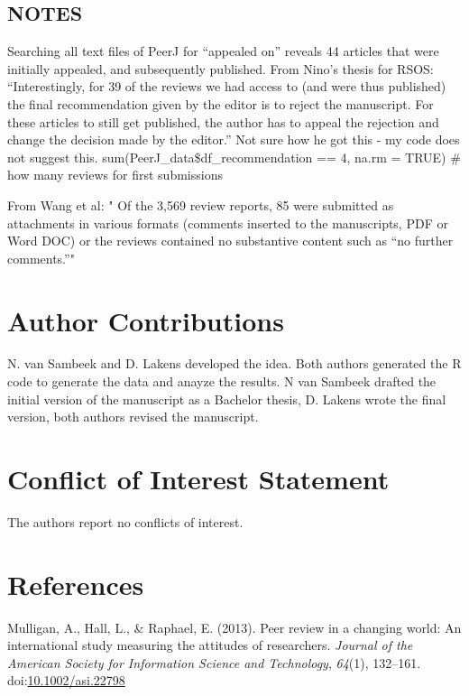 \documentclass[,jou, a4paper,floatsintext]{apa6}
\begin{document}
\hypertarget{notes}{%
\subsection{NOTES}\label{notes}}

Searching all text files of PeerJ for \enquote{appealed on} reveals 44 articles that were initially appealed, and subsequently published.
From Nino's thesis for RSOS: \enquote{Interestingly, for 39 of the reviews we had
access to (and were thus published) the final recommendation given by the editor is to reject the manuscript. For these articles to still get published, the author has to appeal the rejection and change the decision made by the editor.}
Not sure how he got this - my code does not suggest this.
sum(PeerJ\_data\$df\_recommendation == 4, na.rm = TRUE) \# how many reviews for first submissions

From Wang et al: " Of the 3,569 review reports, 85 were submitted as
attachments in various formats (comments inserted to the manuscripts, PDF or Word
DOC) or the reviews contained no substantive content such as \enquote{no further comments.}"

\hypertarget{author-contributions}{%
\section{Author Contributions}\label{author-contributions}}

N. van Sambeek and D. Lakens developed the idea. Both authors generated the R code to generate the data and anayze the results. N van Sambeek drafted the initial version of the manuscript as a Bachelor thesis, D. Lakens wrote the final version, both authors revised the manuscript.

\hypertarget{conflict-of-interest-statement}{%
\section{Conflict of Interest Statement}\label{conflict-of-interest-statement}}

The authors report no conflicts of interest.

\hypertarget{references}{%
\section{References}\label{references}}

\setlength{\parindent}{-0.5in}
\setlength{\leftskip}{0.5in}

\hypertarget{refs}{}
\leavevmode\hypertarget{ref-mulligan_peer_2013}{}%
Mulligan, A., Hall, L., \& Raphael, E. (2013). Peer review in a changing world: An international study measuring the attitudes of researchers. \emph{Journal of the American Society for Information Science and Technology}, \emph{64}(1), 132--161. doi:\href{https://doi.org/10.1002/asi.22798}{10.1002/asi.22798}
\end{document}
